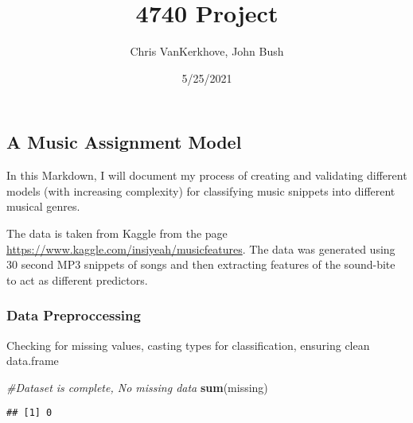 \documentclass[
]{article}
\title{4740 Project}
\author{Chris VanKerkhove, John Bush}
\date{5/25/2021}
\newenvironment{Shaded}{\begin{snugshade}}{\end{snugshade}}
\newcommand{\CommentTok}[1]{\textcolor[rgb]{0.56,0.35,0.01}{\textit{#1}}}
\newcommand{\KeywordTok}[1]{\textcolor[rgb]{0.13,0.29,0.53}{\textbf{#1}}}
\newcommand{\NormalTok}[1]{#1}
\newcommand{\OperatorTok}[1]{\textcolor[rgb]{0.81,0.36,0.00}{\textbf{#1}}}
\newcommand{\StringTok}[1]{\textcolor[rgb]{0.31,0.60,0.02}{#1}}
\begin{document}
\maketitle

\hypertarget{a-music-assignment-model}{%
\subsection{A Music Assignment Model}\label{a-music-assignment-model}}

In this Markdown, I will document my process of creating and validating
different models (with increasing complexity) for classifying music
snippets into different musical genres.

The data is taken from Kaggle from the page
\url{https://www.kaggle.com/insiyeah/musicfeatures}. The data was
generated using 30 second MP3 snippets of songs and then extracting
features of the sound-bite to act as different predictors.

\hypertarget{data-preproccessing}{%
\subsubsection{Data Preproccessing}\label{data-preproccessing}}

Checking for missing values, casting types for classification, ensuring
clean data.frame

\begin{Shaded}
\begin{Highlighting}[]
\CommentTok{#Dataset is complete, No missing data}
\KeywordTok{sum}\NormalTok{(missing)}
\end{Highlighting}
\end{Shaded}

\begin{verbatim}
## [1] 0
\end{verbatim}

\begin{Shaded}
\end{Shaded}
\end{document}
